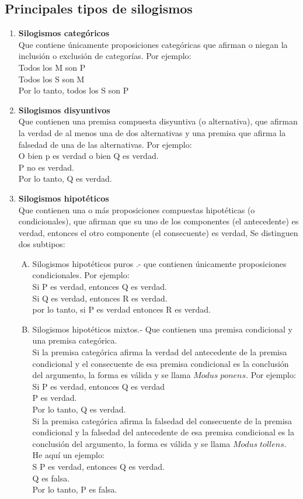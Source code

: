\documentclass[10pt]{book} 						%
\begin{document}
\subsection{Principales tipos de silogismos}
\begin{enumerate}
\item \textbf{Silogismos categóricos}\\
Que contiene únicamente proposiciones categóricas que afirman o niegan la inclusión o exclusión de categorías. Por ejemplo:\\
Todos los M son P\\
Todos los S son M\\
Por lo tanto, todos los S son P
\item \textbf{Silogismos disyuntivos}\\
Que contienen una premisa compuesta disyuntiva (o alternativa), que afirman la verdad de al menos una de dos alternativas y una premisa que afirma la falsedad de una de las alternativas. Por ejemplo:\\
O bien p es verdad o bien Q es verdad.\\
P no es verdad.\\
Por lo tanto, Q es verdad.
\item \textbf{Silogismos hipotéticos}\\
Que contienen una o más proposiciones compuestas hipotéticas (o condicionales), que afirman que su uno de los componentes (el antecedente) es verdad, entonces el otro componente (el consecuente) es verdad, Se distinguen dos subtipos:\\
\begin{enumerate}[A)]
\item Silogismos hipotéticos puros .- que contienen únicamente proposiciones condicionales. Por ejemplo:\\
Si P es verdad, entonces Q es verdad.\\
Si Q es verdad, entonces R es verdad.\\
por lo tanto, si P es verdad entonces R es verdad.
\item Silogismos hipotéticos mixtos.- Que contienen una premisa condicional y una premisa categórica.\\
Si la premisa categórica afirma la verdad del antecedente de la premisa condicional y el consecuente de esa premisa condicional es la conclusión del argumento, la forma es válida y se llama $Modus \; ponens.$ Por ejemplo:\\
Si P es verdad, entonces Q es verdad\\
P es verdad.\\
Por lo tanto, Q es verdad.\\
Si la premisa categórica afirma la falsedad del consecuente de la premisa condicional y la falsedad del antecedente de esa premisa condicional es la conclusión del argumento, la forma es válida y se llama $Modus \; tollens$. He aquí un ejemplo:\\
S P es verdad, entonces Q es verdad.\\
Q es falsa.\\
Por lo tanto, P es falsa.\\
\end{enumerate}
\end{enumerate} 
\end{document}

